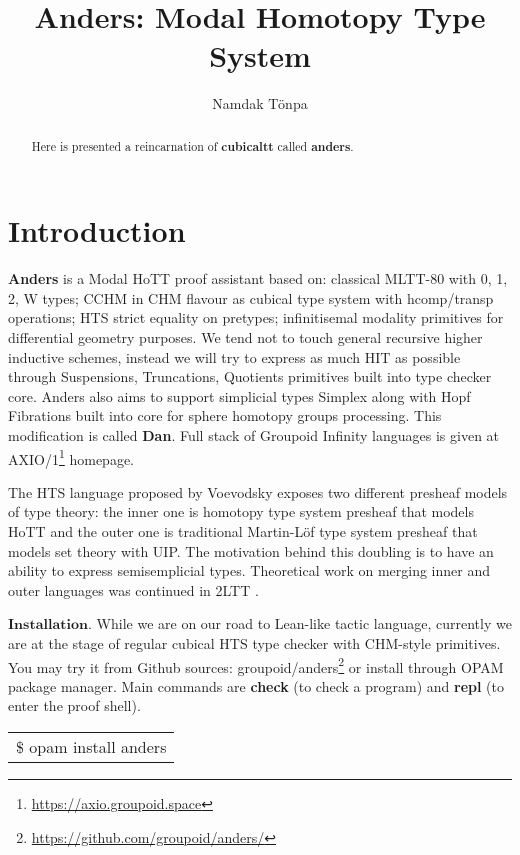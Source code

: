 \documentclass[a4paper,UKenglish,cleveref, autoref, thm-restate]{lipics-v2021}
\title{Anders: Modal Homotopy Type System}
\author{Namdak Tönpa}{Groupoid Infinity}{maxim@synrc.com}{https://orcid.org/0000-0001-7127-8796}{}
\begin{document}
\maketitle

\begin{abstract}
Here is presented a reincarnation of \textbf{cubicaltt} called \textbf{anders}.
\end{abstract}

\section{Introduction}
\label{sec:typesetting-summary}

\textbf{Anders} is a Modal HoTT proof assistant based on: classical MLTT-80 \cite{MLTT80}
with 0, 1, 2, W types; CCHM \cite{CCHM} in CHM \cite{CHM} flavour as cubical type system with
hcomp/transp operations; HTS \cite{HTS} strict equality on pretypes;
infinitisemal \cite{deRham} modality primitives for differential geometry purposes.
We tend not to touch general recursive higher inductive schemes,
instead we will try to express as much HIT as possible through Suspensions, Truncations,
Quotients primitives built into type checker core.
Anders also aims to support simplicial types Simplex along with Hopf Fibrations
built into core for sphere homotopy groups processing. This modification is called \textbf{Dan}.
Full stack of Groupoid Infinity languages is given at AXIO/1\footnote{\url{https://axio.groupoid.space}} homepage.

The HTS language proposed by Voevodsky exposes two different presheaf models of type theory:
the inner one is homotopy type system presheaf that models HoTT and the outer one is
traditional Martin-Löf type system presheaf that models set theory with UIP.
The motivation behind this doubling is to have an ability to express semisemplicial types.
Theoretical work on merging inner and outer languages was continued in 2LTT \cite{2LTT}.

$\mathbf{Installation}$. While we are on our road to Lean-like tactic language, currently we are at the stage of
regular cubical HTS type checker with CHM-style primitives. You may try it from Github
sources: groupoid/anders\footnote{\url{https://github.com/groupoid/anders/}} or install
through OPAM package manager. Main commands are \textbf{check} (to check a program)
and \textbf{repl} (to enter the proof shell).

\begin{table}[ht]
\centering
\begin{tabular}{l}
\$ opam install anders
\end{tabular}
\end{table}
\end{document}
